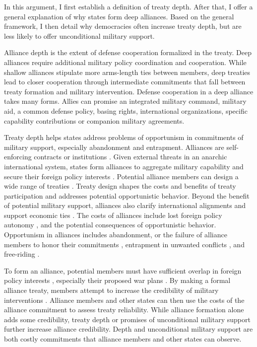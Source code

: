 \documentclass[12pt]{article}
\begin{document}
In this argument, I first establish a definition of treaty depth.  
After that, I offer a general explanation of why states form deep alliances. 
Based on the general framework, I then detail why democracies often increase treaty depth, but are less likely to offer unconditional military support. 


Alliance depth is the extent of defense cooperation formalized in the treaty. 
Deep alliances require additional military policy coordination and cooperation. 
While shallow alliances stipulate more arms-length ties between members, deep treaties lead to closer cooperation through intermediate commitments that fall between treaty formation and military intervention. 
Defense cooperation in a deep alliance takes many forms. 
Allies can promise an integrated military command, military aid, a common defense policy, basing rights, international organizations, specific capability contributions or companion military agreements. 


Treaty depth helps states address problems of opportunism in commitments of military support, especially abandonment and entrapment. 
Alliances are self-enforcing contracts or institutions \citep{Leedsetal2002, Morrow2000}.
Given external threats in an anarchic international system, states form alliances to aggregate military capability and secure their foreign policy interests \citep{Altfield1984, Smith1995, Snyder1997, FordhamPoast2014}. 
Potential alliance members can design a wide range of treaties \citep{Leedsetal2000, Leedsetal2002, Benson2012, BensonClinton2016}. 
Treaty design shapes the costs and benefits of treaty participation and addresses potential opportunistic behavior. 
Beyond the benefit of potential military support, alliances also clarify international alignments \citep{Snyder1990} and support economic ties \citep{Gowa1995, Li2003, Long2003, Fordham2010, WolfordKim2017}. 
The costs of alliances include lost foreign policy autonomy \citep{Altfield1984, Morrow2000, Johnson2015}, and the potential consequences of opportunistic behavior. 
Opportunism in alliances includes abandonment, or the failure of alliance members to honor their commitments \citep{Leeds2003a, BerkemeierFuhrmann2018}, entrapment in unwanted conflicts \citep{Snyder1984}, and free-riding \citep{Morrow2000}.   


To form an alliance, potential members must have sufficient overlap in foreign policy interests \citep{Morrow1991, Smith1995, FordhamPoast2014}, especially their proposed war plans \citep{Poast2019a}. 
By making a formal alliance treaty, members attempt to increase the credibility of military interventions \citep{Morrow2000}. 
Alliance members and other states can then use the costs of the alliance commitment to assess treaty reliability. 
While alliance formation alone adds some credibility, treaty depth or promises of unconditional military support further increase alliance credibility. 
Depth and unconditional military support are both costly commitments that alliance members and other states can observe. 
\end{document}
